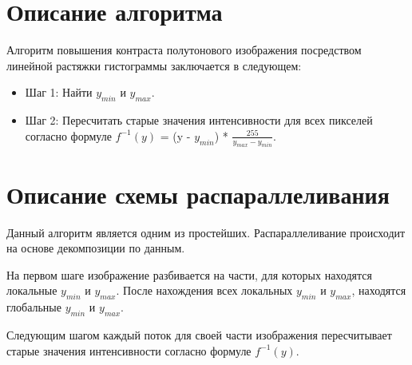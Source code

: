 \documentclass{report}
\begin{document}
\section*{Описание алгоритма}
Алгоритм повышения контраста полутонового изображения посредством линейной растяжки гистограммы заключается в следующем:
\begin{itemize}
\item Шаг 1: Найти $y_{min}$ и $y_{max}$.
\item Шаг 2: Пересчитать старые значения интенсивности для всех пикселей согласно формуле $f^{-1}(y)$ = (y - $y_{min}$) * ${\frac{255}{y_{max} - y_{min}}}$.

\end{itemize}
\newpage

\section*{Описание схемы распараллеливания}
Данный алгоритм является одним из простейших. Распараллеливание происходит на основе декомпозиции по данным. \par На первом шаге изображение разбивается на части, для которых находятся локальные $y_{min}$ и $y_{max}$. После нахождения всех локальных $y_{min}$ и $y_{max}$, находятся глобальные $y_{min}$ и $y_{max}$.
\par Следующим шагом каждый поток для своей части изображения пересчитывает старые значения интенсивности согласно формуле $f^{-1}(y)$.
\newpage

\end{document}
